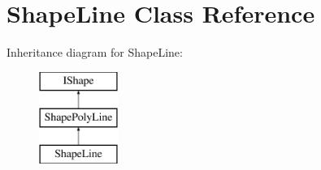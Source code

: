 \hypertarget{class_shape_line}{}\section{Shape\+Line Class Reference}
\label{class_shape_line}
Inheritance diagram for Shape\+Line\+:\begin{figure}[H]
\begin{center}
\leavevmode
\includegraphics[height=3.000000cm]{class_shape_line}
\end{center}
\end{figure}
